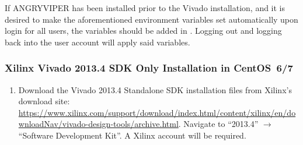 \begin{flushleft}
\begin{flushleft}
\begin{enumerate}
\subitem {}
\subitem {}

\end{enumerate}
If ANGRYVIPER has been installed prior to the Vivado installation, and it is desired to make the aforementioned environment variables set automatically upon login for all users, the variables should be added in . Logging out and logging back into the user account will apply said variables.
\subsubsection{Xilinx Vivado 2013.4 SDK Only Installation in CentOS~6/7}
\label{sec:viv_sdk}
\begin{enumerate}
\item Download the Vivado 2013.4 Standalone SDK installation files from Xilinx's download site:
\url{https://www.xilinx.com/support/download/index.html/content/xilinx/en/downloadNav/vivado-design-tools/archive.html}. Navigate to ``2013.4'' $\rightarrow$ ``Software Development Kit''. A Xilinx account will be required.


\end{enumerate}
\end{flushleft}
\end{flushleft}
